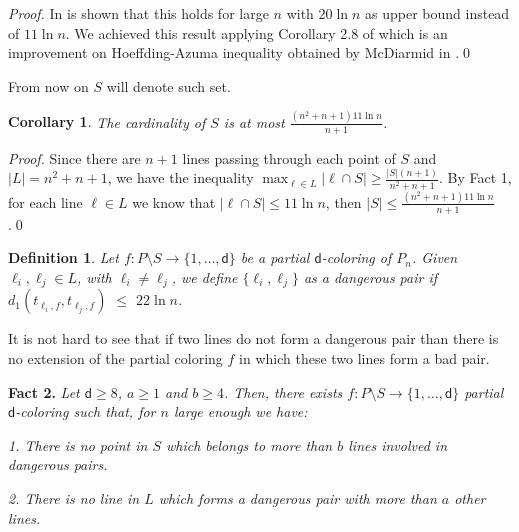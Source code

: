 \documentclass[11pt]{amsart}
\numberwithin{equation}{section}
\newtheorem{definition}         {Definition}
\newtheorem{corollary}          {Corollary}
\begin{document}
 \medskip

\textit{Proof.} In \cite{Alon} is shown that this holds for large $n$ with $20\ln n$ as upper bound instead of $11\ln n.$ We achieved this result applying Corollary 2.8 of \cite{Matas} which is an improvement on Hoeffding-Azuma inequality obtained by McDiarmid in \cite{McDiarmid}.\qed

 \medskip
 
 
 From now on $S$ will denote such set.
 
 \newpage
 
 \begin{corollary} 
The cardinality of $S$ is at most $\frac{(n^2+n+1) 11\ln n}{n+1}$.
\end{corollary}

\textit{Proof.} Since there are $n+1$ lines passing through each point of $S$ and $\vert L \vert = n^2 + n + 1$, we have the inequality  $\max_{\ell \in L} \vert \ell \cap S \vert   \geqslant \frac{\vert S \vert (n+1)}{n^2+n+1}$. By Fact 1, for each line $\ell \in L$ we know that $\vert \ell \cap S \vert \leqslant 11\ln n$, then $\vert S \vert \leqslant \frac{(n^2+n+1)11\ln n}{n+1}$.\qed

 
\medskip

\begin{definition}Let $f \colon P\setminus S \rightarrow \lbrace 1,\ldots, \mathsf{d} \rbrace$ be a partial $\mathsf{d}$-coloring of $P_n$. Given  $\ell_i,\ell_j \in L$, with $\ell_i \neq \ell_j$, we define $\lbrace \ell_i,\ell_j\rbrace $ as a dangerous pair if $d_1(t_{\ell_i,f} , t_{\ell_j,f})$ $\leqslant$ $22\ln n$.
\end{definition}

\medskip

It is not hard to see that if two lines do not form a dangerous pair than there is no extension of the partial coloring $f$ in which these two lines form a bad pair. 

\medskip
 
\textbf{Fact 2.} \textit{Let $\mathsf{d} \geq 8$, $a\geq 1$ and $b\geq 4$. Then, there exists $f \colon P\setminus S \rightarrow \lbrace 1,\ldots, \mathsf{d} \rbrace$ partial $\mathsf{d}$-coloring such that, for $n$ large enough we have:}

 \textit{1. There is no point in $S$ which belongs to more than $b$ lines involved in dangerous pairs.}
 
 \textit{2. There is no line in $L$ which forms a dangerous pair with more than $a$ other lines.}
\end{document}

